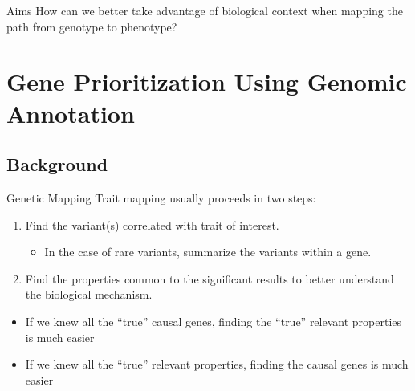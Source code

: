 \documentclass[bigger]{beamer}
\begin{document}
\begin{frame}{Aims}
  How can we better take advantage of biological context when mapping the  path from genotype to phenotype?
      \pause
\end{frame}

\section{Gene Prioritization Using Genomic Annotation}

\subsection{Background}

\begin{frame}{Genetic Mapping}
  Trait mapping usually proceeds in two steps:
  \begin{enumerate}
  \item Find the variant(s) correlated with trait of interest.
    \begin{itemize}
    \item In the case of rare variants, summarize the variants within a gene.
    \end{itemize}
      \pause
  \item Find the properties common to the significant results to better understand the biological mechanism.
  \end{enumerate}
    \pause
\begin{itemize}
\item If we knew all the ``true'' causal genes, finding the ``true'' relevant properties is much easier
  \pause
\item If we knew all the ``true'' relevant properties, finding the causal genes is much easier
\end{itemize}
\end{frame}
\end{document}
